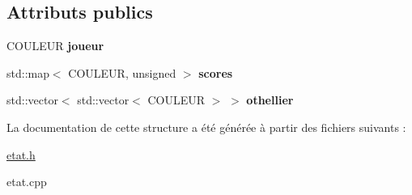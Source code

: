 \subsection*{Attributs publics}
\begin{DoxyCompactItemize}
\item 
C\+O\+U\+L\+E\+UR {\bfseries joueur}\hypertarget{structEtat_a0f6ef7f21d75e5a2c216fba4da8eadf5}{}\label{structEtat_a0f6ef7f21d75e5a2c216fba4da8eadf5}

\item 
std\+::map$<$ C\+O\+U\+L\+E\+UR, unsigned $>$ {\bfseries scores}\hypertarget{structEtat_adbf6b7995516b31b79d0f176aed8e58a}{}\label{structEtat_adbf6b7995516b31b79d0f176aed8e58a}

\item 
std\+::vector$<$ std\+::vector$<$ C\+O\+U\+L\+E\+UR $>$ $>$ {\bfseries othellier}\hypertarget{structEtat_aaeff32b606c827277a5503e05188dfa4}{}\label{structEtat_aaeff32b606c827277a5503e05188dfa4}

\end{DoxyCompactItemize}


La documentation de cette structure a été générée à partir des fichiers suivants \+:\begin{DoxyCompactItemize}
\item 
\hyperlink{etat_8h}{etat.\+h}\item 
etat.\+cpp\end{DoxyCompactItemize}

